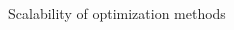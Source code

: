 \documentclass[aspectratio=169]{beamer}
\begin{document}
\begin{frame}{Scalability of optimization methods}
\begin{columns}
\begin{column}{0.49\textwidth}
        \end{column}
    \end{columns}
\end{frame}
\end{document}
